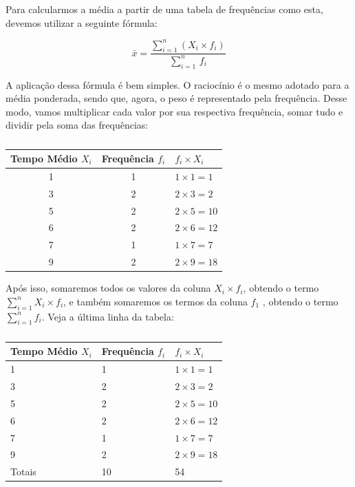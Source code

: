 Para calcularmos a média a partir de uma tabela de frequências como esta, devemos utilizar a seguinte fórmula:

\[
    \bar{x}=\frac{\sum_{i=1}^{n}(X_i\times f_i)}{\sum_{i=1}^{n}\,f_i}
\]

A aplicação dessa fórmula é bem simples. O raciocínio é o mesmo adotado para a média ponderada, sendo que, agora, o peso é representado pela frequência. Desse modo, vamos multiplicar cada valor por sua respectiva frequência, somar tudo e dividir pela soma das frequências:

\begin{table}[H]
    \centering
\begin{tabular}{ccl}
\toprule
\shortstack{Tempo \\Médio \(X_i\)} &Frequência \(f_i\)  &\(f_i\times X_i\)\\
\midrule
1      &1   &\(1\times 1 =1\)\\
3      &2   &\(2\times 3 =2\)\\
5      &2   &\(2\times 5 =10\)\\
6      &2   &\(2\times 6 =12\)\\
7      &1   &\(1\times 7 =7\)\\
9      &2   &\(2\times 9 =18\)\\
\bottomrule
\end{tabular}
\caption{}
\end{table}

Após isso, somaremos todos os valores da coluna \(X_i\times f_i\), obtendo o termo \(\sum_{i=1}^{n} X_i\times f_i\), e também somaremos os termos da coluna \(f_1\) , obtendo o termo \(\sum_{i=1}^{n} f_i\). Veja a última linha da tabela:

\begin{table}[H]
    \centering
\begin{tabular}{lll}
\toprule
\shortstack{Tempo \\Médio \(X_i\)} &Frequência \(f_i\)  &\(f_i\times X_i\)\\
\midrule
1      &1   &\(1\times 1 =1\)\\
3      &2   &\(2\times 3 =2\)\\
5      &2   &\(2\times 5 =10\)\\
6      &2   &\(2\times 6 =12\)\\
7      &1   &\(1\times 7 =7\)\\
9      &2   &\(2\times 9 =18\)\\
\midrule
Totais &10  &54\\
\bottomrule
\end{tabular}
\caption{}
\end{table}

